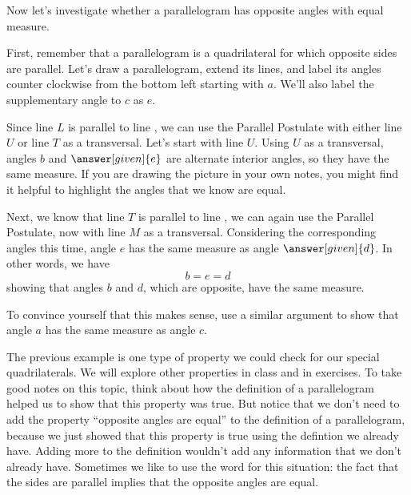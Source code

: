 \documentclass{ximera}
\begin{document}
Now let's investigate whether a parallelogram has opposite angles with equal measure.
\begin{explanation}
First, remember that a parallelogram is a quadrilateral for which opposite sides are parallel. Let's draw 
a parallelogram, extend its lines, and label its angles counter clockwise from the bottom left starting with $a$. We'll also label the supplementary angle to $c$ as $e$.
\begin{image}
\end{image}

Since line $L$ is parallel to line , we can use 
the Parallel Postulate with either line $U$ or line $T$ as a transversal. Let's start with line $U$. 
Using $U$ as a transversal, angles $b$ and $\answer[given]{e}$ are alternate interior angles, so they have the 
same measure.  If you are drawing the picture in your own notes, you might find it helpful to highlight the angles 
that we know are equal.

Next, we know that line $T$ is parallel to line  ,
 we can again use the Parallel Postulate, now with line $M$ as a transversal. Considering the corresponding angles 
 this time, angle $e$ has the same measure as angle $\answer[given]{d}$. In other words, we have
\[
b=e=d 
\]
showing that angles $b$ and $d$, which are opposite, have the same measure.

To convince yourself that this makes sense, use a similar argument to show that angle $a$ has the same measure 
as angle $c$.

\end{explanation}

The previous example is one type of property we could check for our special quadrilaterals. We will explore 
other properties in class and in exercises. To take good notes on this topic, think about how the definition 
of a parallelogram helped us to show that this property was true. But notice that we don't need to add the 
property ``opposite angles are equal'' to the definition of a parallelogram, because we just showed that this 
property is true using the defintion we already have. Adding more to the definition wouldn't add any information 
that we don't already have. Sometimes we like to use the word  for this situation: the fact that 
the sides are parallel implies that the opposite angles are equal.
\end{document}
